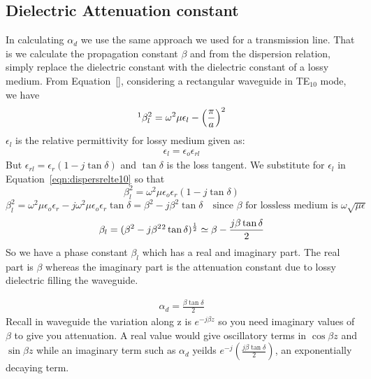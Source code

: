 \subsection{Dielectric Attenuation constant}
In calculating  $\alpha_{d}$ we use the same approach we used for a transmission line. That is we calculate the propagation constant $\beta$ and from the dispersion relation, simply replace the dielectric constant with the dielectric constant of a lossy medium. From Equation~\eqref{}, considering a rectangular waveguide in TE$_{10}$ mode, we have
\begin{equation}
\footnotemark\beta_l^{2} = \omega^{2}\mu\epsilon_{l} -\left(\frac{\pi}{a}\right)^{2}
\label{eqn:dispersrelte10}
\end{equation}
$\epsilon_{l}$ is the relative permittivity for lossy medium given as:
\begin{align*}
\epsilon_{l} = \epsilon_{o}\epsilon_{rl}
\end{align*}
But $\epsilon_{rl} = \epsilon_{r}(1-j\tan\delta)$ and $\tan\delta$ is the loss tangent. We substitute for $\epsilon_{l}$ in Equation~\eqref{eqn:dispersrelte10} so that
\begin{equation*}
\beta^{2}_{l} = \omega^{2}\mu\epsilon_{o}\epsilon_{r}(1-j\tan\delta)
\end{equation*}
\begin{dmath*}
\beta^{2}_{l} = \omega^{2}\mu\epsilon_{o}\epsilon_{r} - j\omega^{2}\mu\epsilon_{o}\epsilon_{r}\tan\delta
= \beta^{2} - j\beta^{2}\tan\delta\quad\text{since $\beta$ for lossless medium is $\omega\sqrt{\mu\epsilon}$}
\end{dmath*}
\begin{dmath}
\beta_{l} = (\beta^{2} - j\beta^{2}\footnotemark\tan\delta)^{\frac{1}{2}}
\simeq \beta - \frac{j\beta\tan\delta}{2}
\end{dmath}
So we have a phase constant $\beta_{l}$ which has a real and imaginary part. The real part is $\beta$ whereas the imaginary part is the attenuation constant due to lossy dielectric filling the waveguide.

\begin{align}
\alpha_{d} = \frac{\beta\tan\delta}{2}
\label{eqn:alphad}
\end{align}
Recall in waveguide the variation along z is $e^{-j\beta z}$ so you need imaginary values of $\beta$ to give you attenuation. A real value would give oscillatory terms in $\cos\beta z$ and $\sin\beta z$ while an imaginary term such as $\alpha_d$ yeilds $e^{-j}(\frac{j\beta\tan\delta}{2})$, an exponentially decaying term.

